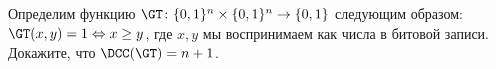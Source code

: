 Определим функцию $\GT\colon \{0, 1\}^n \times \{0, 1\}^n \to \{0, 1\}$ следующим образом:
$\GT(x, y) = 1 \Leftrightarrow x \ge y$, где $x, y$ мы воспринимаем как числа в битовой записи.
Докажите, что $\DCC(\GT) = n + 1$.
